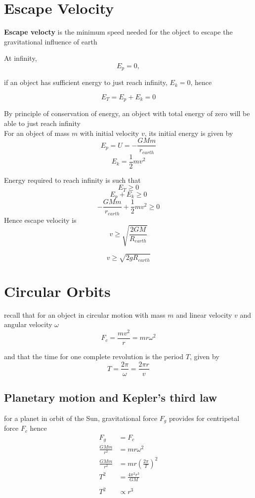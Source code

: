 \documentclass[a4paper, 10pt]{article}
\begin{document}
\section{Escape Velocity}
\begin{framed}
   \textbf{Escape velocty} is the minimum speed needed for the object to escape the gravitational influence of earth \\
\end{framed}	

At infinity, 
\[
 E_p = 0, 
\]

if an object has sufficient energy to just reach infinity, $E_k = 0$, hence 

\[
 E_T = E_p + E_k = 0
\]

By principle of conservation of energy, an object with total energy of zero will be able to just reach infinity \\

For an object of mass $m$ with initial velocity $v$, its initial energy is given by
\[
   E_p = U = - \frac{GMm}{r_{earth}}
\]
\[
E_k = \frac{1}{2} mv^2
\]

Energy required to reach infinity is such that
\[
 E_T \ge 0
\]
\[
E_p + E_k \ge 0
\]
\[
    - \frac{GMm}{r_{earth}}  + \frac{1}{2}mv^2 \ge 0
\]
Hence escape velocity is 
\[
   v \ge \sqrt{ \frac{2GM}{R_{earth}}}
\]

\[
   v \ge \sqrt{2gR_{earth}}
\]



\section{Circular Orbits}
recall that for an object in circular motion with mass $m$ and linear velocity $v$ and angular velocity $\omega$ 
\[
F_c = \frac{mv^2}{r} = mr\omega^2
\]

and that the time for one complete revolution is the period $T$, given by
\[
T = \frac{2\pi}{\omega} = \frac{2\pi r}{v}
\]


\subsection{Planetary motion and Kepler's third law}

for a planet in orbit of the Sun, gravitational force $F_g$ provides for centripetal force $F_c$ hence 
\begin{align*}
   F_g &= F_c \\ 
   \frac{GMm}{r^2} &= mr\omega^2 \\ 
   \frac{GMm}{r^2} &= mr \left( \frac{2\pi}{T}\right)^2 \\ 
   T^2 &= \frac{4\pi^2r^3}{GM} \\ \\
   T^2 &\propto r^3
\end{align*}	
\end{document}
